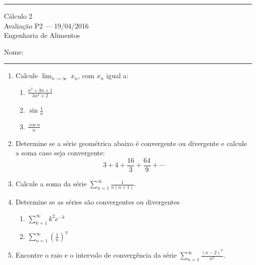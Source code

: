 \documentclass{article}
\newcommand{\ds}{\displaystyle}
\begin{document}
\noindent{}\rule{\textwidth}{0.4pt}
\begin{center}
	C\'alculo 2\\
	Avalia\c{c}\~ao P2 --- 19/04/2016 \\
	Engenharia de Alimentos \\
	\vspace{0.2cm}
\end{center}
Nome: \\
\noindent{}\rule{\textwidth}{0.4pt}

\begin{enumerate}
\item Calcule $\displaystyle\lim_{n\rightarrow\infty}\ x_n$, com $x_n$ igual a:
	\begin{enumerate}
		\item $\ds\frac{n^2+3n+1}{3n^2+2}$
		\item $\ds\sin\frac{1}{n}$
		\item $\ds\frac{\cos n}{n}$
	\end{enumerate}

\item Determine se a s\'erie geom\'etrica abaixo \'e convergente ou divergente e calcule a soma caso seja convergente:
$$\ds3+4+\frac{16}{3}+\frac{64}{9}+\cdots$$

\item Calcule a soma da s\'erie $\ds\sum_{n=1}^\infty\ds\frac{1}{n(n+1)}$.

\item Determine se as s\'eries s\~ao convergentes ou divergentes
	\begin{enumerate}
		\item $\ds\sum_{k=1}^\infty k^2 e^{-k}$
		\item $\ds\sum_{n=1}^\infty \left(\frac{1}{n}\right)^\pi$
	\end{enumerate}

\item Encontre o raio e o intervalo de converg\^encia da s\'erie
$\ds\sum_{n=1}^\infty \frac{(x-2)^n}{n^n}$.

\end{enumerate}
\end{document}
